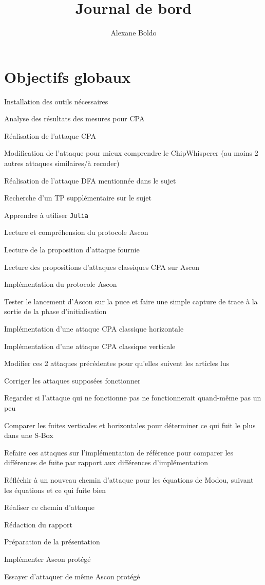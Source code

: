 \documentclass[12pt]{article}
\author{Alexane Boldo}
\title{Journal de bord}
\newcommand{\cmark}{\ding{51}}%
\newcommand{\done}{\rlap{$\square$}{\raisebox{2pt}{\large\hspace{1pt}\cmark}}%
	\hspace{-2.5pt}}
\begin{document}
	\maketitle
	
	\tableofcontents
	\section{Objectifs globaux}
	\begin{todolist}
		\item[\done] Installation des outils nécessaires
		\item[\done] Analyse des résultats des mesures pour CPA
		\item[\done] Réalisation de l'attaque CPA
		\item[\done] Modification de l'attaque pour mieux comprendre le ChipWhisperer (au moins 2 autres attaques similaires/à recoder)
		\item[\done] Réalisation de l'attaque DFA mentionnée dans le sujet
		\item[\done] Recherche d'un TP supplémentaire sur le sujet
		\item[\done] Apprendre à utiliser \verb|Julia|
		\item[\done] Lecture et compréhension du protocole Ascon
		\item[\done] Lecture de la proposition d'attaque fournie
		\item[\done] Lecture des propositions d'attaques classiques CPA sur Ascon
		\item[\done] Implémentation du protocole Ascon
		\item[\done] Tester le lancement d'Ascon sur la puce et faire une simple capture de trace à la sortie de la phase d'initialisation
		\item[\done] Implémentation d'une attaque CPA classique horizontale
		\item[\done] Implémentation d'une attaque CPA classique verticale
		\item[\done] Modifier ces 2 attaques précédentes pour qu'elles suivent les articles lus
		\item Corriger les attaques supposées fonctionner
		\item Regarder si l'attaque qui ne fonctionne pas ne fonctionnerait quand-même pas un peu
		\item[\done] Comparer les fuites verticales et horizontales pour déterminer ce qui fuit le plus dans une S-Box
		\item[\done] Refaire ces attaques sur l'implémentation de référence pour comparer les différences de fuite par rapport aux différences d'implémentation
		\item[\done] Réfléchir à un nouveau chemin d'attaque pour les équations de Modou, suivant les équations et ce qui fuite bien
		\item Réaliser ce chemin d'attaque
		\item Rédaction du rapport
		\item Préparation de la présentation
		\item Implémenter Ascon protégé
		\item Essayer d'attaquer de même Ascon protégé
	\end{todolist}
\end{document}
